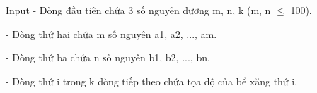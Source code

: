 Input
- Dòng đầu tiên chứa 3 số nguyên dương m, n, k (m, n  $\le$  100).   


   - Dòng thứ hai chứa m số nguyên a1, a2, ..., am.   


   - Dòng thứ ba chứa n số nguyên b1, b2, ..., bn.   


   - Dòng thứ i trong k dòng tiếp theo chứa tọa độ của bể xăng thứ i.
